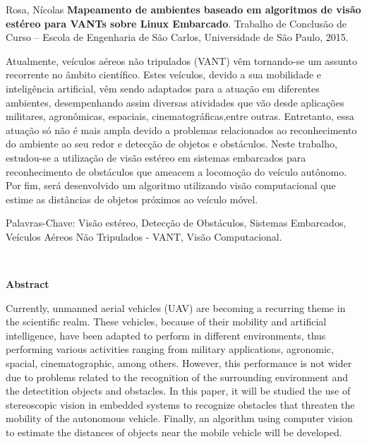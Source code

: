 \vspace{0.05\textheight}
Rosa, Nícolas \textbf{Mapeamento de ambientes baseado em algoritmos de visão estéreo para VANTs sobre Linux Embarcado}. Trabalho de Conclusão de Curso -- Escola de Engenharia de São Carlos, Universidade de São Paulo, 2015.

Atualmente, veículos aéreos não tripulados (VANT) vêm tornando-se um assunto recorrente no âmbito científico. Estes veículos, devido a sua mobilidade e inteligência artificial, vêm sendo adaptados para a atuação em diferentes ambientes, desempenhando assim diversas atividades que vão desde
aplicações militares, agronômicas, espaciais, cinematográficas,entre outras.    
Entretanto, essa atuação só não é mais ampla devido a problemas relacionados ao reconhecimento do ambiente ao seu redor e detecção de objetos e obstáculos. Neste trabalho, estudou-se a utilização de visão estéreo em sistemas embarcados para reconhecimento de obstáculos que ameacem a locomoção do veículo autônomo. Por fim, será desenvolvido um algoritmo utilizando visão computacional que estime as distâncias de objetos próximos ao veículo móvel.

\vspace{0.05\textheight}
	
Palavras-Chave: Visão estéreo, Detecção de Obstáculos, Sistemas Embarcados, Veículos Aéreos Não Tripulados - VANT, Visão Computacional.

\cleardoublepage

\
\vspace{0.11\textheight} 

\begin{center}
\textbf{\Huge{Abstract}}
\end{center}

\vspace{0.05\textheight}	
		
Currently, unmanned aerial vehicles (UAV) are becoming a recurring theme in the scientific realm. These vehicles, because of their mobility and artificial intelligence, have been adapted to perform in different environments, thus performing various activities ranging from
military applications, agronomic, spacial, cinematographic, among others.
However, this performance is not wider due to  problems related to the recognition of the surrounding environment and the detectition objects and obstacles. In this paper, it will be studied the use of stereoscopic vision in embedded systems to recognize obstacles that threaten the mobility of the autonomous vehicle. Finally, an algorithm using computer vision to estimate the distances of objects near the mobile vehicle will be developed.

